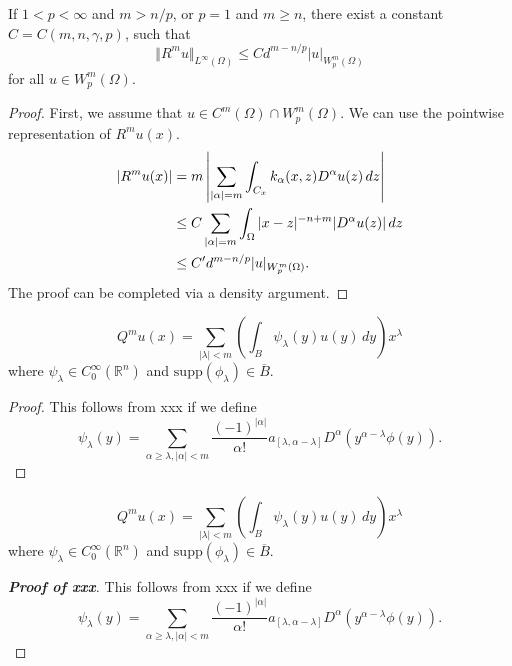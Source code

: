 \documentclass{article}
\begin{document}
\begin{theorem*}
    If $1<p<\infty$ and $m > n/p$, or $p=1$ and $m \ge n$, there exist a constant $C = C(m,n,\gamma,p)$, such that
    \begin{equation*}
        \Vert R^m u \Vert_{L^\infty(\Omega)} \le C d^{m-n/p} |u|_{W^m_p(\Omega)}
    \end{equation*}
    for all $u \in W^m_p(\Omega)$.
\end{theorem*}
\begin{proof}
    First, we assume that $u \in C^m(\Omega) \cap W^m_p(\Omega)$. We can use the pointwise representation of $R^mu(x)$.
    \begin{align*}
        |R^mu(x)| ={} & m \left| \sum_{|\alpha| = m} \int_{C_x} k_{\alpha}(x,z) D^\alpha u(z)\,dz \right| \notag \\
        \le{}         & C \sum_{|\alpha|=m} \int_{\Omega} |x-z|^{-n+m} |D^\alpha u(z)|\,dz \notag                \\
        \le{}         & C' d^{m-n/p} |u|_{W^m_p(\Omega)}.
    \end{align*}
    The proof can be completed via a density argument.
\end{proof}

\begin{proposition}
    \begin{equation*}
        Q^m u(x) = \sum_{|\lambda| < m} \left( \int_B \psi_\lambda(y) u(y)\,dy \right) x^\lambda
    \end{equation*}
    where $\psi_\lambda \in C_0^\infty(\mathbb{R}^n)$ and $\mathrm{supp}(\phi_\lambda) \in \overline{B}$.
\end{proposition}
\begin{proof}
    This follows from xxx if we define
    \begin{equation*}
        \psi_\lambda(y) = \sum_{\alpha \ge \lambda,|\alpha|<m}
        \frac{(-1)^{|\alpha|}}{\alpha !} a_{[\lambda,\alpha-\lambda]} D^\alpha(y^{\alpha-\lambda} \phi(y)).
    \end{equation*}
\end{proof}

\begin{proposition}[xxx]
    \begin{equation*}
        Q^m u(x) = \sum_{|\lambda| < m} \left( \int_B \psi_\lambda(y) u(y)\,dy \right) x^\lambda
    \end{equation*}
    where $\psi_\lambda \in C_0^\infty(\mathbb{R}^n)$ and $\mathrm{supp}(\phi_\lambda) \in \overline{B}$.
\end{proposition}
\begin{proof}[\upshape\bfseries Proof of xxx]
    This follows from xxx if we define
    \begin{equation*}
        \psi_\lambda(y) = \sum_{\alpha \ge \lambda,|\alpha|<m}
        \frac{(-1)^{|\alpha|}}{\alpha !} a_{[\lambda,\alpha-\lambda]} D^\alpha(y^{\alpha-\lambda} \phi(y)).
    \end{equation*}
\end{proof}
\end{document}
